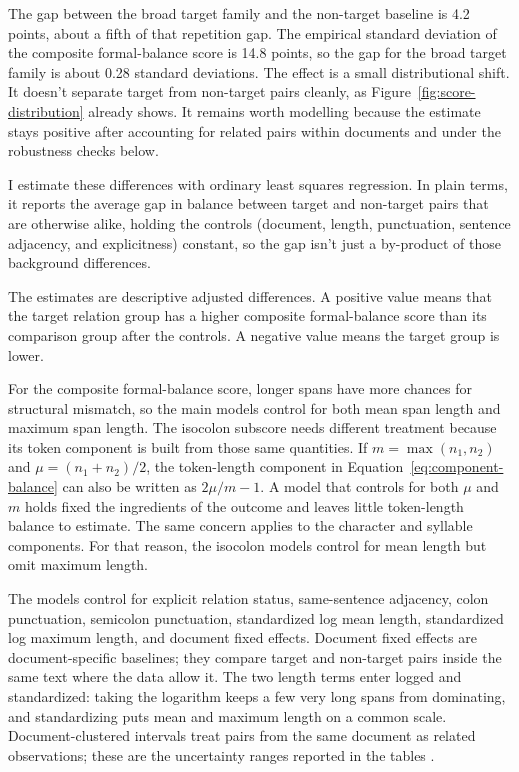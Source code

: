 \documentclass[12pt]{article}
\begin{document}
The gap between the broad target family and the non-target baseline is 4.2
points, about a fifth of that repetition gap. The empirical standard
deviation of the composite formal-balance score
is 14.8 points, so the gap for the broad target family is about 0.28 standard
deviations. The effect is a small distributional shift. It doesn't separate
target from non-target pairs cleanly, as Figure~\ref{fig:score-distribution}
already shows. It remains worth modelling because the estimate stays positive
after accounting for related pairs within documents and under the robustness
checks below.

I estimate these differences with ordinary least squares regression. In
plain terms, it reports the average gap in balance between target and
non-target pairs that are otherwise alike, holding the controls (document,
length, punctuation, sentence adjacency, and explicitness) constant, so the
gap isn't just a by-product of those background differences.

The estimates are descriptive adjusted differences. A positive value means
that the target relation group has a higher composite formal-balance score
than its comparison group after the controls. A negative value means the
target group is lower.

For the composite formal-balance score, longer spans have more chances for
structural mismatch, so the main models control for both mean span length
and maximum span length. The isocolon subscore needs different treatment
because its token component is built from those same quantities. If
\(m=\max(n_1,n_2)\) and \(\mu=(n_1+n_2)/2\), the token-length component
in Equation~\ref{eq:component-balance} can also be written as
\(2\mu/m - 1\). A model that controls for both \(\mu\) and \(m\) holds
fixed the ingredients of the outcome and leaves little token-length balance
to estimate. The same concern applies to the character and syllable
components. For that reason, the isocolon models control for mean length but
omit maximum length.

The models control for explicit relation status, same-sentence adjacency,
colon punctuation, semicolon punctuation, standardized log mean length,
standardized log maximum length, and document fixed effects. Document fixed
effects are document-specific baselines; they compare target and non-target
pairs inside the same text where the data allow it. The two length terms
enter logged and standardized: taking the logarithm keeps a few very long
spans from dominating, and standardizing puts mean and maximum length on a
common scale. Document-clustered intervals treat pairs from the same
document as related observations; these are the uncertainty ranges reported
in the tables \citep{cameronMiller2015ClusterRobust}.
\end{document}
